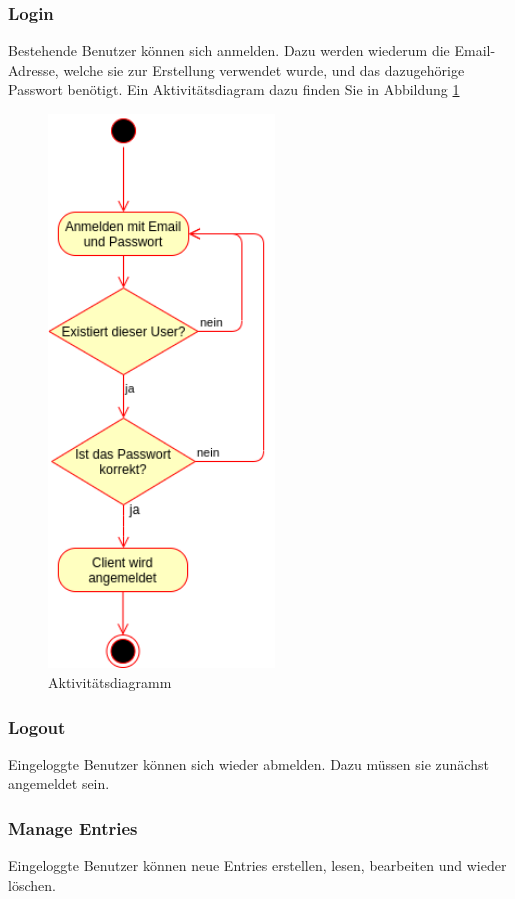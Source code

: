 \documentclass[a4paper, titlepage]{article}
\begin{document}
    \subsubsection{Login}
    Bestehende Benutzer können sich anmelden. Dazu werden wiederum
    die Email-Adresse, welche sie zur Erstellung verwendet wurde,
    und das dazugehörige Passwort benötigt. Ein Aktivitätsdiagram
    dazu finden Sie in Abbildung \ref{activity}

    \begin{figure}
        \begin{center}
            \includegraphics[width=6cm]{images/Aktivitaetsdiagramm.png}     
        \end{center}
        \caption{Aktivitätsdiagramm}
        \label{activity}
    \end{figure}

    \subsubsection{Logout}
    Eingeloggte Benutzer können sich wieder abmelden. Dazu müssen
    sie zunächst angemeldet sein.

    \subsubsection{Manage Entries}
    Eingeloggte Benutzer können neue Entries erstellen, lesen,
    bearbeiten und wieder löschen.
\end{document}
